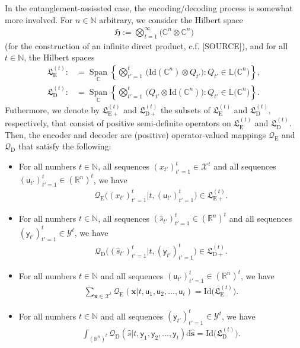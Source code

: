 \documentclass[conference]{IEEEtran}
\newcommand{\ry}{\mathsf{y}}
\newcommand{\ru}{\mathsf{u}}
\def\X{{\mathcal X}}
\def\Y{{\mathcal Y}}
\def\NN{{\mathbb N}}
\def\RR{{\mathbb R}}
\def\CC{{\mathbb C}}
\newcommand{\QE}{\mathcal{Q}_{\mathrm{E}}}
\newcommand{\QD}{\mathcal{Q}_{\mathrm{D}}}
\DeclareMathOperator{\Span}{Span}
\newcommand{\sdummy}{{\color{red}[SOURCE]}}
\begin{document}
	In the entanglement-assissted case, the encoding/decoding process is somewhat more involved. For \(n\in\NN\) arbitrary,
	we consider the Hilbert space
	\begin{align}	\mathfrak{H} := \bigotimes_{t = 1}^{\infty} \big(\mathbb{C}^{n}\otimes \mathbb{C}^{n}\big)
	\end{align}
	(for the construction of an infinite direct product, c.f. \sdummy), and for all \(t\in\NN\), the Hilbert spaces
	\begin{align}	\mathfrak{L}_{\mathrm{E}}^{(t)} :&= 
					\underset{\mathbb{C}}{\Span} \left\{\bigotimes_{t'=1}^{t}\hspace{2pt} \big(\mathrm{Id}(\CC^n) \otimes Q_{t'}\big) : Q_{t'} \in \mathbb{L}\big(\mathbb{C}^{n}\big)\right\}, \\
					\mathfrak{L}_{\mathrm{D}}^{(t)} :&= 
					\underset{\mathbb{C}}{\Span} \left\{\bigotimes_{t'=1}^{t}\hspace{2pt} \big(Q_{t'} \otimes \mathrm{Id}(\CC^n)\big) : Q_{t'} \in \mathbb{L}\big(\mathbb{C}^{n}\big)\right\}.
	\end{align}
	Futhermore, we denote by \(\mathfrak{L}_{\mathrm{E}+}^{(t)}\) and \(\mathfrak{L}_{\mathrm{D}+}^{(t)}\) the subsets of \(\mathfrak{L}_{\mathrm{E}}^{(t)}\) and 
	\(\mathfrak{L}_{\mathrm{D}}^{(t)}\), respectively, that consist of positive semi-definite operators on \(\mathfrak{L}_{\mathrm{E}}^{(t)}\) and \(\mathfrak{L}_{\mathrm{D}}^{(t)}\). 
	Then, the encoder and decoder are (positive) operator-valued mappings \(\QE\) and \(\QD\) that satisfy the following:
	\begin{itemize}	\item   For all numbers \(t \in \NN\), all sequences \((x_{t'})_{t'=1}^t\in\X^t\) and all sequences \((\ru_{t'})_{t'=1}^{t}\in (\RR^n)^t\), we have
						\begin{align}   \QE\Big((x_{t'})_{t'=1}^t\Big|t,(\ru_{t'})_{t'=1}^{t}\Big) \in \mathfrak{L}_{\mathrm{E}+}^{(t)}.
						\end{align}
					\item   For all numbers \(t\in \NN\), all sequences \((\hat{s}_{t'})_{t'=1}^{t}\in(\RR^n)^t\) and all sequences \((\ry_{t'})_{t'=1}^{t}\in\Y^t\), we have
						\begin{align}   \QD\Big((\hat{s}_{t'})_{t'=1}^{t}\Big|t,(\ry_{t'})_{t'=1}^{t}\Big) \in \mathfrak{L}_{\mathrm{D}+}^{(t)}.
						\end{align}
					\item   For all numbers \(t\in \NN\) and all sequences \((\ru_{t'})_{t'=1}^{t}\in (\RR^n)^t\), we have
						\begin{align}  \sum_{\bm{x}\in\X^t} \QE(\bm{x}|t,\ru_1,\ru_2,\ldots,\ru_t) = \mathrm{Id}\Big(\mathfrak{L}_{\mathrm{E}}^{(t)}\Big).
						\end{align}
					\item   For  all numbers \(t\in \NN\) and all sequences \((\ry_{t'})_{t'=1}^{t}\in \Y^t\), we have
						\begin{align}  \int_{(\RR^n)^t} \QD(\hat{s}|t,\ry_1,\ry_2,\ldots,\ry_t) \mathrm{d}\hat{\bm{s}} = \mathrm{Id}\Big(\mathfrak{L}_{\mathrm{D}}^{(t)}\Big).
						\end{align} 
	\end{itemize}
\end{document}
